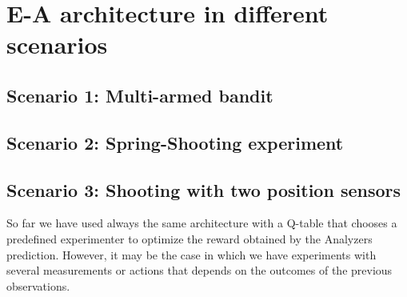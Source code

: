 \documentclass[11pt,a4paper,twoside]{report}
\newcommand{\+}{\textnormal{+} }
\theoremstyle{definition}
\numberwithin{equation}{chapter}
\begin{document}
  \chapter{E-A architecture in different scenarios} 
  \label{Scenarios}
  \section{Scenario 1: Multi-armed bandit}

  \section{Scenario 2: Spring-Shooting experiment}

  \section{Scenario 3: Shooting with two position sensors}

  So far we have used always the same architecture with a Q-table that chooses
  a predefined experimenter to optimize the reward obtained by the Analyzers 
  prediction. However, it may be the case in which we have experiments with 
  several measurements or actions that depends on the outcomes of the previous
  observations. 
  


\clearpage
%
%
%
\end{document}
